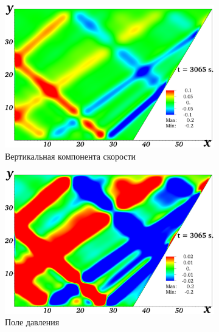 \begin{figure}
  \centering
    \begin{subfigure}[с]{0.45\textwidth}
        \includegraphics[width=1\textwidth]{pics/H40L60N1ap02dp20w1p58w2p66Biharm/2D36x36DiagramH40L60N1ap02dp20w1p58w2p66BiharmVyn06129.png}
        \caption{Вертикальная компонента скорости}
    \end{subfigure}
    \begin{subfigure}[с]{0.45\textwidth}
        \includegraphics[width=1\textwidth]{pics/H40L60N1ap02dp20w1p58w2p66Biharm/2D36x36DiagramH40L60N1ap02dp20w1p58w2p66BiharmVy6129.png}
        \caption{Поле давления}
    \end{subfigure}
    \par
    \begin{subfigure}[с]{0.45\textwidth}

\end{subfigure}
\end{figure}
